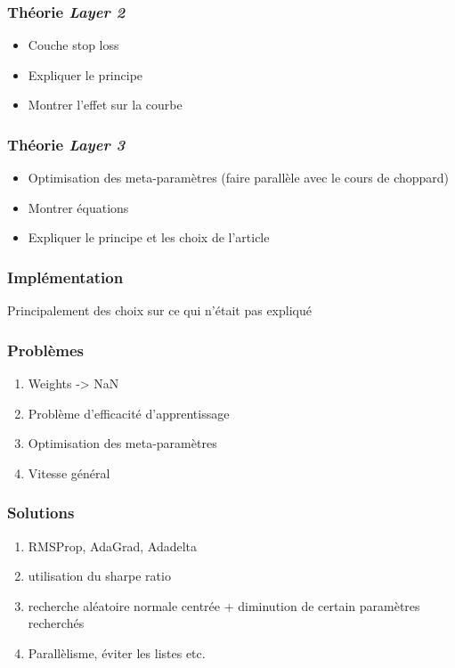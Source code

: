 \documentclass{beamer}
\begin{document}
	\begin{frame}
		\frametitle{Théorie \textit{Layer 2}}
		\begin{itemize}
			\item Couche stop loss
			\item Expliquer le principe
			\item Montrer l'effet sur la courbe
		\end{itemize}
	\end{frame}

	\begin{frame}
		\frametitle{Théorie \textit{Layer 3}}
		\begin{itemize}
			\item Optimisation des meta-paramètres (faire parallèle avec le cours de choppard)
			\item Montrer équations
			\item Expliquer le principe et les choix de l'article
		\end{itemize}
	\end{frame}

	\begin{frame}
		\frametitle{Implémentation}
		Principalement des choix sur ce qui n'était pas expliqué
	\end{frame}

	\begin{frame}
		\frametitle{Problèmes}
		\begin{enumerate}
			\item Weights -> NaN
			\item Problème d'efficacité d'apprentissage
			\item Optimisation des meta-paramètres
			\item Vitesse général
		\end{enumerate}
	\end{frame}

	\begin{frame}
		\frametitle{Solutions}
		\begin{enumerate}
			\item RMSProp, AdaGrad, Adadelta
			\item utilisation du sharpe ratio
			\item recherche aléatoire normale centrée + diminution de certain paramètres recherchés
			\item Parallèlisme, éviter les listes etc.
		\end{enumerate}
	\end{frame}
	
\end{document}
